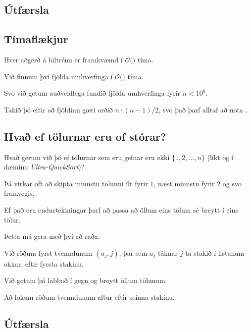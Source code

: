 \subsection{Útfærsla}
{
}

\subsection{Tímaflækjur}
{
    {
        \item<1-> Hver aðgerð á biltrénu er framkvæmd í $\mathcal{O}($$)$ tíma.
        \item<3-> Við finnum því fjölda umhverfinga í $\mathcal{O}($$)$ tíma.
        \item<5-> Svo við getum auðveldlega fundið fjölda umhverfinga fyrir $n < 10^6$.
        \item<6-> Takið þó eftir að fjöldinn gæti orðið $n \cdot (n - 1)/2$, svo það þarf alltaf að nota .
    }
}

\subsection{Hvað ef tölurnar eru of stórar?}
{
    {
        \item<1-> Hvað gerum við þó ef tölurnar sem eru gefnar eru ekki $\{1, 2, ..., n\}$ (líkt og í dæminu \emph{Ultra-QuickSort})?
        \item<2-> Þá virkar oft að skipta minnstu tölunni út fyrir $1$, næst minnstu fyrir $2$ og svo framvegis.
        \item<3-> Ef það eru endurtekiningar þarf að passa að öllum eins tölum sé breytt í eins tölur.
        \item<4-> Þetta má gera með því að raða.
        \item<5-> Við röðum fyrst tvenndunum $(a_j, j)$, þar sem $a_j$ táknar $j$-ta stakið í listanum okkar, eftir fyrsta stakinu.
        \item<6-> Við getum þá labbað í gegn og breytt öllum tölunum.
        \item<7-> Að lokum röðum tvenndunum aftur eftir seinna stakinu.
    }
}

\subsection{Útfærsla}
{
}

